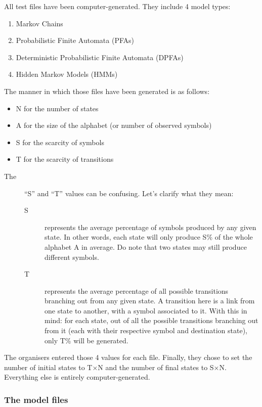 All test files have been computer-generated. They include 4 model
types:
\begin{enumerate}
\item Markov Chains
\item Probabilistic Finite Automata (PFAs)
\item Deterministic Probabilistic Finite Automata (DPFAs)
\item Hidden Markov Models (HMMs)
\end{enumerate}
The manner in which those files have been generated is as follows:
\begin{itemize}
\item N for the number of states
\item A for the size of the alphabet (or number of observed symbols)
\item S for the scarcity of symbols
\item T for the scarcity of transitions\end{itemize}
\begin{description}
\item [{\textmd{The}}] ``S'' and ``T'' values can be confusing. Let's
clarify what they mean:

\begin{description}
\item [{S}] represents the average percentage of symbols produced by any
given state. In other words, each state will only produce S\% of the
whole alphabet A in average. Do note that two states may still produce
different symbols.
\item [{T}] represents the average percentage of all possible transitions
branching out from any given state. A transition here is a link from
one state to another, with a symbol associated to it. With this in
mind: for each state, out of all the possible transitions branching
out from it (each with their respective symbol and destination state),
only T\% will be generated.
\end{description}
\end{description}
The organisers entered those 4 values for each file. Finally, they
chose to set the number of initial states to T$\times$N and the number
of final states to S$\times$N. Everything else is entirely computer-generated. 


\subsubsection{The model files}

